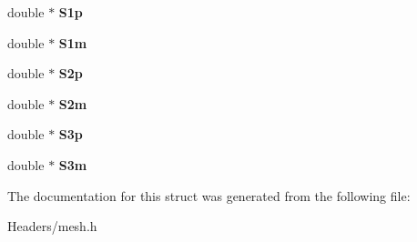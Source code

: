 \begin{DoxyCompactItemize}
double $\ast$ {\bfseries S1p}
\item 
\mbox{\label{structgrid___a53a83f9d1be868b6a8597d9299c28b0a}} 
double $\ast$ {\bfseries S1m}
\item 
\mbox{\label{structgrid___ac6451df09dd330af588c59a65371b96a}} 
double $\ast$ {\bfseries S2p}
\item 
\mbox{\label{structgrid___a55583121a699e4ba6c293f587526b535}} 
double $\ast$ {\bfseries S2m}
\item 
\mbox{\label{structgrid___a58712514231d3abe7d4ed67f5afbf3ab}} 
double $\ast$ {\bfseries S3p}
\item 
\mbox{\label{structgrid___ab231046900b239ff5de7c6ebd57a155c}} 
double $\ast$ {\bfseries S3m}
\end{DoxyCompactItemize}


The documentation for this struct was generated from the following file\+:\begin{DoxyCompactItemize}
\item 
Headers/mesh.\+h\end{DoxyCompactItemize}
